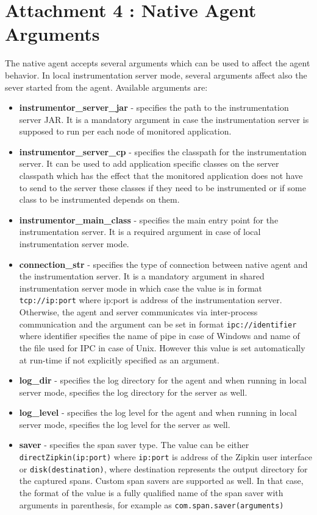 \documentclass[12pt,a4paper]{report}
\begin{document}
\chapter*{Attachment 4 : Native Agent Arguments}
\setcounter{page}{1}
The native agent accepts several arguments which can be used to affect the agent behavior. In local instrumentation server mode, several arguments affect also the sever started from the agent. Available arguments are:
\begin{itemize}
	\item \textbf{instrumentor\_server\_jar} - specifies the path to the instrumentation server JAR. It is a mandatory argument in case the instrumentation server is supposed to run per each node of monitored application.
	\item \textbf{instrumentor\_server\_cp} - specifies the classpath for the instrumentation server. It can be used to add application specific classes on the server classpath which has the effect that the monitored application does not have to send to the server these classes if they need to be instrumented or if some class to be instrumented depends on them.
	\item \textbf{instrumentor\_main\_class} - specifies the main entry point for the instrumentation server. It is a required argument in case of local instrumentation server mode.
	\item \textbf{connection\_str} - specifies the type of connection between native agent and the instrumentation server. It is a mandatory argument in shared instrumentation server mode in which case the value is in format \texttt{tcp://ip:port} where ip:port is address of the instrumentation server. Otherwise, the agent and server communicates via inter-process communication and the argument can be set in format \texttt{ipc://identifier} where identifier specifies the name of pipe in case of Windows and name of the file used for IPC in case of Unix. However this value is set automatically at run-time if not explicitly specified as an argument.
	\item \textbf{log\_dir} - specifies the log directory for the agent and when running in local server mode, specifies the log directory for the server as well.
	\item \textbf{log\_level} - specifies the log level for the agent and when running in local server mode, specifies the log level for the server as well.
	\item \textbf{saver} - specifies the span saver type. The value can be either \newline \texttt{directZipkin(ip:port)} where \texttt{ip:port} is address of the Zipkin user interface or \texttt{disk(destination)}, where destination represents the output directory for the captured spans. Custom span savers are supported as well. In that case, the format of the value is a fully qualified name of the span saver with arguments in parenthesis, for example as \texttt{com.span.saver(arguments)}

\end{itemize}
\end{document}
